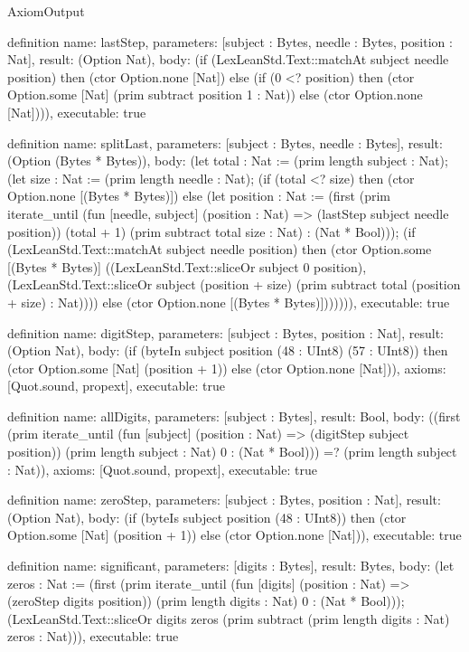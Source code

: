 \begin{lexlean}{AxiomOutput}
\begin{semanticmodule}
definition{
  name: lastStep,
  parameters: [subject : Bytes, needle : Bytes, position : Nat],
  result: (Option Nat),
  body: (if (LexLeanStd.Text::matchAt subject needle position) then (ctor Option.none [Nat]) else (if (0 <? position) then (ctor Option.some [Nat] (prim subtract position 1 : Nat)) else (ctor Option.none [Nat]))),
  executable: true
}

definition{
  name: splitLast,
  parameters: [subject : Bytes, needle : Bytes],
  result: (Option (Bytes * Bytes)),
  body: (let total : Nat := (prim length subject : Nat); (let size : Nat := (prim length needle : Nat); (if (total <? size) then (ctor Option.none [(Bytes * Bytes)]) else (let position : Nat := (first (prim iterate_until (fun [needle, subject] (position : Nat) => (lastStep subject needle position)) (total + 1) (prim subtract total size : Nat) : (Nat * Bool))); (if (LexLeanStd.Text::matchAt subject needle position) then (ctor Option.some [(Bytes * Bytes)] ((LexLeanStd.Text::sliceOr subject 0 position), (LexLeanStd.Text::sliceOr subject (position + size) (prim subtract total (position + size) : Nat)))) else (ctor Option.none [(Bytes * Bytes)])))))),
  executable: true
}

definition{
  name: digitStep,
  parameters: [subject : Bytes, position : Nat],
  result: (Option Nat),
  body: (if (byteIn subject position (48 : UInt8) (57 : UInt8)) then (ctor Option.some [Nat] (position + 1)) else (ctor Option.none [Nat])),
  axioms: [Quot.sound, propext],
  executable: true
}

definition{
  name: allDigits,
  parameters: [subject : Bytes],
  result: Bool,
  body: ((first (prim iterate_until (fun [subject] (position : Nat) => (digitStep subject position)) (prim length subject : Nat) 0 : (Nat * Bool))) =? (prim length subject : Nat)),
  axioms: [Quot.sound, propext],
  executable: true
}

definition{
  name: zeroStep,
  parameters: [subject : Bytes, position : Nat],
  result: (Option Nat),
  body: (if (byteIs subject position (48 : UInt8)) then (ctor Option.some [Nat] (position + 1)) else (ctor Option.none [Nat])),
  executable: true
}

definition{
  name: significant,
  parameters: [digits : Bytes],
  result: Bytes,
  body: (let zeros : Nat := (first (prim iterate_until (fun [digits] (position : Nat) => (zeroStep digits position)) (prim length digits : Nat) 0 : (Nat * Bool))); (LexLeanStd.Text::sliceOr digits zeros (prim subtract (prim length digits : Nat) zeros : Nat))),
  executable: true
}


\end{semanticmodule}
\end{lexlean}
